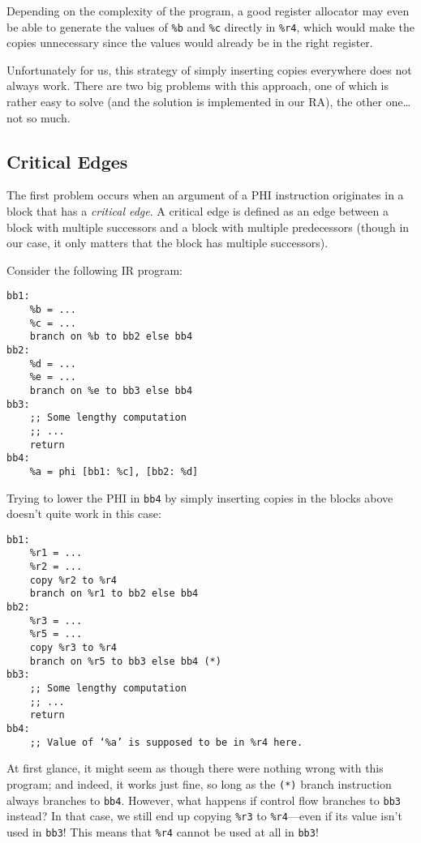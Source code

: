 \documentclass[12pt]{report}
\begin{document}
\noindent Depending on the complexity of the program, a good register allocator may even be able to generate the values of \verb|%b| and
\verb|%c| directly in \verb|%r4|, which would make the copies unnecessary since the values would already be in the right register.

Unfortunately for us, this strategy of simply inserting copies everywhere does not always work. There are two big problems with this
approach, one of which is rather easy to solve (and the solution is implemented in our RA), the other one\ldots{} not so much.

\subsection{Critical Edges}
The first problem occurs when an argument of a PHI instruction originates in a block that has a \textit{critical edge}. A critical edge is
defined as an edge between a block with multiple successors and a block with multiple predecessors (though in our case, it only matters
that the block has multiple successors).

Consider the following IR program:
\begin{Verbatim}
bb1:
    %b = ...
    %c = ...
    branch on %b to bb2 else bb4
bb2:
    %d = ...
    %e = ...
    branch on %e to bb3 else bb4
bb3:
    ;; Some lengthy computation
    ;; ...
    return
bb4:
    %a = phi [bb1: %c], [bb2: %d]
\end{Verbatim}

\noindent Trying to lower the PHI in \verb|bb4| by simply inserting copies in the blocks above doesn't quite work in this case:
\begin{Verbatim}
bb1:
    %r1 = ...
    %r2 = ...
    copy %r2 to %r4
    branch on %r1 to bb2 else bb4
bb2:
    %r3 = ...
    %r5 = ...
    copy %r3 to %r4
    branch on %r5 to bb3 else bb4 (*)
bb3:
    ;; Some lengthy computation
    ;; ...
    return
bb4:
    ;; Value of ‘%a’ is supposed to be in %r4 here.
\end{Verbatim}

\noindent At first glance, it might seem as though there were nothing wrong with this program; and indeed, it works just fine, so long
as the \verb|(*)| branch instruction always branches to \verb|bb4|. However, what happens if control flow branches to \verb|bb3| instead?
In that case, we still end up copying \verb|%r3| to \verb|%r4|—even if its value isn't used in \verb|bb3|! This means that \verb|%r4|
cannot be used at all in \verb|bb3|!
\end{document}
